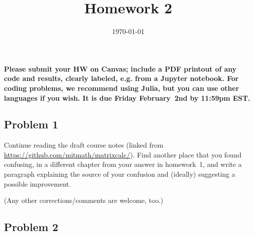 \documentclass[10pt,oneside]{article}
\author{}
\title{Homework 2}
\date{\today}
\begin{document}
\maketitle
\thispagestyle{fancy} 

{\bf Please submit your HW on Canvas; include a PDF printout of any code and results, clearly labeled, e.g. from a Jupyter notebook.  For coding problems, we recommend using Julia, but you can use other languages if you wish. It is due Friday February~2nd by 11:59pm EST.  }

\subsection*{Problem 1}

Continue reading the draft course notes (linked from \url{https://github.com/mitmath/matrixcalc/}).   Find another place that you found confusing, in a different chapter from your answer in homework~1, and write a paragraph explaining the source of your confusion and (ideally) suggesting a possible improvement.

(Any other corrections/comments are welcome, too.)

\subsection*{Problem 2}
\end{document}
